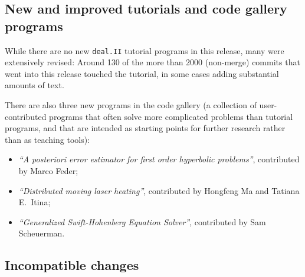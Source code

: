 \documentclass{ansarticle-preprint}
\newcommand{\specialword}[1]{\texttt{#1}}
\newcommand{\dealii}{{\specialword{deal.II}}\xspace}
\begin{document}


\subsection{New and improved tutorials and code gallery programs}
\label{subsec:steps}

While there are no new \dealii tutorial programs in this release, many
were extensively revised: Around 130 of the more than 2000 (non-merge)
commits that went into this release touched the tutorial, in some
cases adding substantial amounts of text.


There are also three new programs in the code gallery (a collection of
user-contributed programs that often solve more complicated problems
than tutorial programs, and that are intended as starting points for further
research rather than as teaching tools):
\begin{itemize}
  \item \textit{``A posteriori error estimator for first order hyperbolic problems''},
  contributed by Marco Feder;
  \item \textit{``Distributed moving laser heating''}, contributed by
  Hongfeng Ma and Tatiana E.~Itina;
  \item \textit{``Generalized Swift-Hohenberg Equation Solver''}, contributed by
  Sam Scheuerman.
\end{itemize}


\subsection{Incompatible changes}\label{subsec:deprecated}
\end{document}
